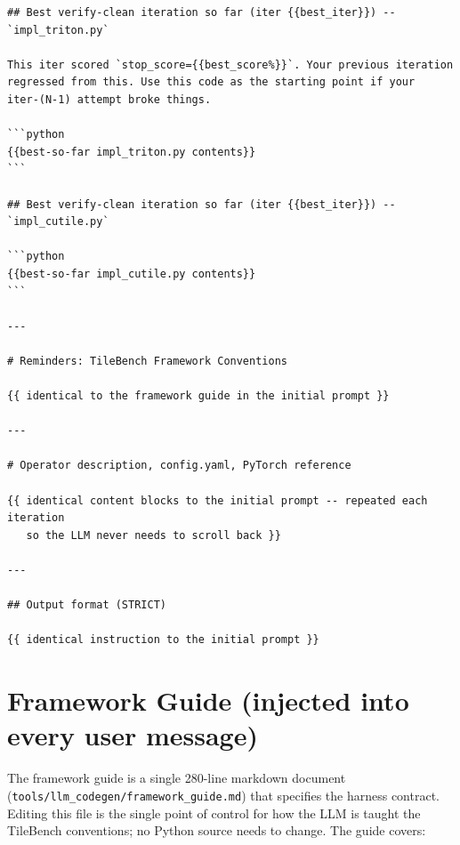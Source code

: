 \documentclass[11pt]{article}
\begin{document}
\begin{promptbox}
\begin{verbatim}
## Best verify-clean iteration so far (iter {{best_iter}}) -- `impl_triton.py`

This iter scored `stop_score={{best_score%}}`. Your previous iteration
regressed from this. Use this code as the starting point if your
iter-(N-1) attempt broke things.

```python
{{best-so-far impl_triton.py contents}}
```

## Best verify-clean iteration so far (iter {{best_iter}}) -- `impl_cutile.py`

```python
{{best-so-far impl_cutile.py contents}}
```

---

# Reminders: TileBench Framework Conventions

{{ identical to the framework guide in the initial prompt }}

---

# Operator description, config.yaml, PyTorch reference

{{ identical content blocks to the initial prompt -- repeated each iteration
   so the LLM never needs to scroll back }}

---

## Output format (STRICT)

{{ identical instruction to the initial prompt }}
\end{verbatim}
\end{promptbox}

\section{Framework Guide (injected into every user message)}

The framework guide is a single 280-line markdown document
(\texttt{tools/llm\_codegen/framework\_guide.md}) that specifies the
harness contract. Editing this file is the single point of control for
how the LLM is taught the TileBench conventions; no Python source needs
to change. The guide covers:
\end{document}
